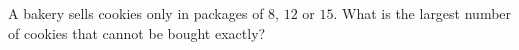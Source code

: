 A bakery sells cookies only in packages of $8$, $12$ or $15$. What is the largest number of cookies that cannot be bought exactly?

